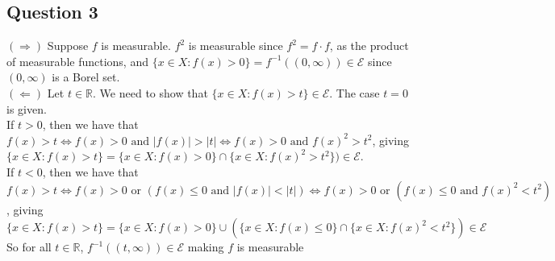 \documentclass[letterpaper, 11pt]{article}
\newcommand{\1}{\mathds{1}}	%
\theoremstyle{definition}
\begin{document}
\subsection*{Question 3}
$(\Rightarrow )$ Suppose $f$ is measurable. $f^2$ is measurable since $f^2 = f\cdot f$, as the product of measurable functions, and $\{x \in X: f(x) > 0\} = f^{-1}((0, \infty )) \in \mathcal{E}$ since $(0, \infty)$ is a Borel set. \\
$(\Leftarrow)$ Let $t \in \mathbb{R}$. We need to show that $\{x \in X: f(x) > t\} \in \mathcal{E}$. The case $t=0$ is given.\\ If $t  > 0$, then we have that $f(x)>t \iff f(x) > 0 \text{ and } |f(x)| > |t| \iff f(x) > 0 \text{ and } f(x)^2 > t^2 $, giving \\ $\{x \in X: f(x) > t\} = \{x \in X: f(x) > 0\} \cap \{x \in X: f(x)^2 > t^2\} ) \in \mathcal{E}$. \\ If $ t < 0$, then we have that $f(x) > t \iff f(x) > 0 \text{ or } (f(x) \le 0 \text{ and } |f(x)| < |t|) \iff f(x) > 0 \text{ or } (f(x) \le 0 \text{ and } f(x)^2 < t^2)  $, giving \\$\{x \in X:f(x) > t\} = \{x \in X: f(x) > 0\} \cup (\{x \in X: f(x) \le 0\} \cap \{x \in X: f(x)^2  < t^2\}) \in \mathcal{E}$ \\ So for all $t\in \mathbb{R}$, $f^{-1}((t, \infty)) \in \mathcal{E}$ making $f$ is measurable
\end{document}
